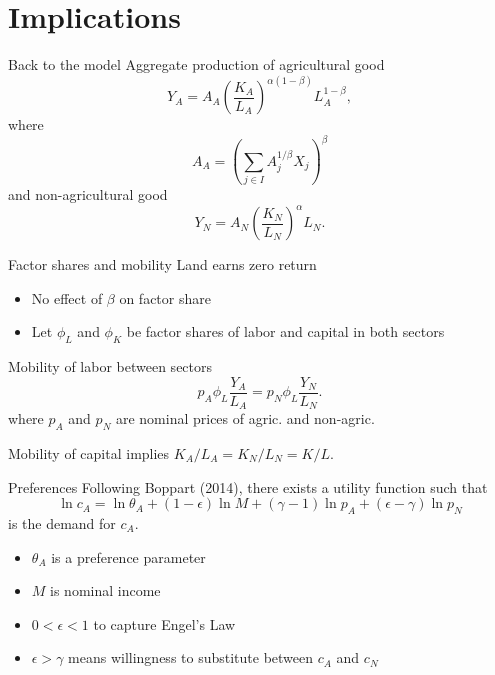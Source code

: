 \documentclass[10pt, xcolor=dvipsnames]{beamer}
\begin{document}
\section{Implications}

\begin{frame}{Back to the model}\label{extend}
Aggregate production of agricultural good
\begin{equation}
    Y_A = A_A \left(\frac{K_A}{L_A}\right)^{\alpha(1-\beta)} L_A^{1-\beta}, \label{EQ_caL_solve}
\end{equation}
where 
\begin{equation}
    A_A = \left(\sum_{j\in I} A_{j}^{1/\beta}X_{j} \right)^\beta \nonumber
\end{equation}
and non-agricultural good
\begin{equation}
    Y_N = A_N \left(\frac{K_N}{L_N}\right)^{\alpha} L_N. \label{EQ_YN}
\end{equation}
\end{frame}

\begin{frame}{Factor shares and mobility}
Land earns zero return
\begin{itemize}
  \item No effect of $\beta$ on factor share
  \item Let $\phi_L$ and $\phi_K$ be factor shares of labor and capital in both sectors
\end{itemize}

\vspace{2mm} Mobility of labor between sectors
\begin{equation}
    p_A \phi_L \frac{Y_A}{L_A} = p_N \phi_L \frac{Y_N}{L_N}. \label{EQ_mobility}
\end{equation}
where $p_A$ and $p_N$ are nominal prices of agric. and non-agric.

\vspace{2mm} Mobility of capital implies $K_A/L_A = K_N/L_N = K/L$.

\end{frame}

\begin{frame}{Preferences}
Following Boppart (2014), there exists a utility function such that
\begin{equation}
    \ln c_A = \ln \theta_A + (1-\epsilon) \ln M + (\gamma - 1) \ln p_A + (\epsilon - \gamma) \ln p_N \label{EQ_ca_demand}
\end{equation}
is the demand for $c_A$.
\begin{itemize}
  \item $\theta_A$ is a preference parameter
  \item $M$ is nominal income
  \item $0 < \epsilon < 1$ to capture Engel's Law
  \item $\epsilon > \gamma$ means willingness to substitute between $c_A$ and $c_N$
\end{itemize}
\end{frame}
\end{document}
